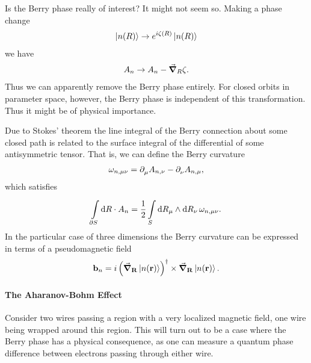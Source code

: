 Is the Berry phase really of interest? It might not seem so. Making a phase change
\begin{align*}
	\ket{n(R)}\to e^{i\zeta(R)}\ket{n(R)}
\end{align*}
we have
\begin{align*}
	A_{n}\to A_{n} - \grad_{R}\zeta.
\end{align*}
Thus we can apparently remove the Berry phase entirely. For closed orbits in parameter space, however, the Berry phase is independent of this transformation. Thus it might be of physical importance.

Due to Stokes' theorem the line integral of the Berry connection about some closed path is related to the surface integral of the differential of some antisymmetric tensor. That is, we can define the Berry curvature
\begin{align*}
	\omega_{n, \mu\nu} = \partial^{}_{\mu}A_{n, \nu} - \partial^{}_{\nu}A_{n, \mu},
\end{align*}
which satisfies
\begin{align*}
	\int\limits_{\partial S}^{}\dd{R}\cdot A_{n} = \frac{1}{2}\int\limits_{S}^{}\dd{R_{\mu}}\wedge\dd{R_{\nu}}\omega_{n, \mu\nu}.
\end{align*}
In the particular case of three dimensions the Berry curvature can be expressed in terms of a pseudomagnetic field
\begin{align*}
	\vb{b}_{n} = i\left(\grad_{\vb{R}}\ket{n(\vb{r})}\right)^{\dagger}\times\grad_{\vb{R}}\ket{n(\vb{r})}.
\end{align*}

\paragraph{The Aharanov-Bohm Effect}
Consider two wires passing a region with a very localized magnetic field, one wire being wrapped around this region. This will turn out to be a case where the Berry phase has a physical consequence, as one can measure a quantum phase difference between electrons passing through either wire.

